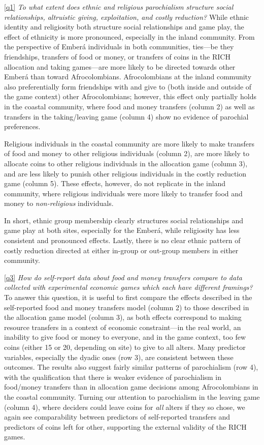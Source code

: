 \documentclass[bibauthoryear]{aa}
\begin{document}
\ref{q1} \emph{To what extent does ethnic and religious parochialism structure social relationships, altruistic giving, exploitation, and costly reduction?} While ethnic identity and religiosity both structure social relationships and game play, the effect of ethnicity is more pronounced, especially in the inland community. From the perspective of Ember\'a individuals in both communities, ties---be they friendships, transfers of food or money, or transfers of coins in the RICH allocation and taking games---are more likely to be directed towards other Ember\'a than toward Afrocolombians. Afrocolombians at the inland community also preferentially form friendships with and give to (both inside and outside of the game context) other Afrocolombians; however, this effect only partially holds in the coastal community, where food and money transfers (column 2) as well as transfers in the taking/leaving game (column 4) show no evidence of parochial preferences.

 Religious individuals in the coastal community are more likely to make transfers of food and money to other religious individuals (column 2), are more likely to allocate coins to other religious individuals in the allocation game (column 3), and are less likely to punish other religious individuals in the costly reduction game (column 5). These effects, however, do not replicate in the inland community, where religious individuals were more likely to transfer food and money to \textit{non-religious} individuals. 
 
 In short, ethnic group membership clearly structures social relationships and game play at both sites, especially for the Ember\'a, while religiosity has less consistent and pronounced effects. Lastly, there is no clear ethnic pattern of costly reduction directed at either in-group or out-group members in either community.


\ref{q3} \emph{How do self-report data about food and money transfers compare to data collected with experimental economic games which each have different framings?} To answer this question, it is useful to first compare the effects described in the self-reported food and money transfers model (column 2) to those described in the allocation game model (column 3), as both effects correspond to making resource transfers in a context of economic constraint---in the real world, an inability to give food or money to everyone, and in the game context, too few coins (either 15 or 20, depending on site) to give to all alters. Many predictor variables, especially the dyadic ones (row 3), are consistent between these outcomes. The results also suggest fairly similar patterns of parochialism (row 4), with the qualification that there is weaker evidence of parochialism in food/money transfers than in allocation game decisions among Afrocolombians in the coastal community. Turning our attention to parochialism in the leaving game (column 4), where deciders could leave coins for \textit{all} alters if they so chose, we again see comparability between predictors of self-reported transfers and predictors of coins left for other, supporting the external validity of the RICH games.
\end{document}
